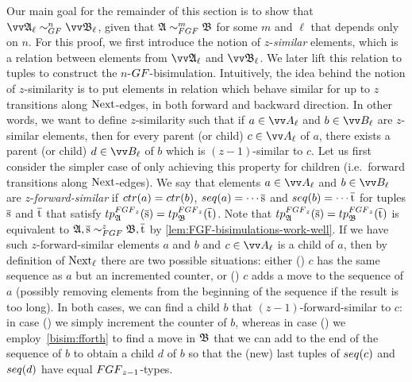 Our main goal for the remainder of this section is to show that $\unravel{A}_{\ell} \bisimto_{\GF}^{n} \unravel{B}_{\ell}$, given that $\str{A} \bisimto_{\FGF}^{m} \str{B}$ for some $m$ and $\ell$ that depends only on $n$.
For this proof, we first introduce the notion of $z$-\emph{similar} elements, which is a relation between elements from $\unravel{A}_{\ell}$ and $\unravel{B}_{\ell}$.
We later lift this relation to tuples to construct the $n$-$\GF$-bisimulation.
Intuitively, the idea behind the notion of $z$-similarity is to put elements in relation which behave similar for up to $z$ transitions along $\mathrm{Next}$-edges, in both forward and backward direction.
In other words, we want to define $z$-similarity such that if $a \in \unraveldom{A}_{\ell}$ and $b \in \unraveldom{B}_{\ell}$ are $z$-similar elements, then for every parent (or child) $c \in \unraveldom{A}_{\ell}$ of $a$, there exists a parent (or child) $d \in \unraveldom{B}_{\ell}$ of $b$ which is $(z-1)$-similar to $c$.
Let us first consider the simpler case of only achieving this property for children (i.e.\ forward transitions along $\mathrm{Next}$-edges).
We say that elements $a \in \unraveldom{A}_{\ell}$ and $b \in \unraveldom{B}_{\ell}$ are $z$-\emph{forward-similar} if $\ctr{a} = \ctr{b}$, $\seq{a} = \cdots \elemtuples$ and $\seq{b} = \cdots \elemtuplet$ for tuples $\overline{\mathrm{s}}$ and $\overline{\mathrm{t}}$ that satisfy $\tp{\FGF_{z}}{\str{A}}{\elemtuples} = \tp{\FGF_{z}}{\str{B}}{\elemtuplet}$.
Note that $\tp{\FGF_{z}}{\str{A}}{\elemtuples} = \tp{\FGF_{z}}{\str{B}}{\elemtuplet}$ is equivalent to $\str{A}, \elemtuples \bisimto_{\FGF}^{z} \str{B}, \elemtuplet$ by \cref{lem:FGF-bisimulations-work-well}.
If we have such $z$-forward-similar elements $a$ and $b$ and $c \in \unraveldom{A}_{\ell}$ is a child of $a$, then by definition of $\mathrm{Next}_{\ell}$ there are two possible situations: either () $c$ has the same sequence as $a$ but an incremented counter, or () $c$ adds a move to the sequence of $a$ (possibly removing elements from the beginning of the sequence if the result is too long).
In both cases, we can find a child $b$ that $(z-1)$-forward-similar to $c$: in case () we simply increment the counter of $b$, whereas in case () we employ~\ref{bisim:fforth} to find a move in ${\mathfrak{B}}$ that we can add to the end of the sequence of $b$ to obtain a child $d$ of $b$ so that the (new) last tuples of $\seq{c}$ and $\seq{d}$ have equal $\FGF_{z-1}$-types.

